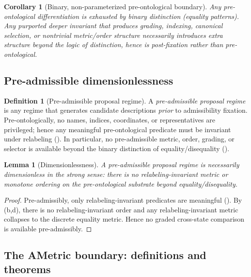 \documentclass[11pt]{article}
\newtheorem{lemma}[theorem]{Lemma}
\newtheorem{corollary}[theorem]{Corollary}
\theoremstyle{definition}
\newtheorem{definition}[theorem]{Definition}
\begin{document}
\begin{corollary}[Binary, non-parameterized pre-ontological boundary]
\label{cor:binary-ametric-boundary}
Any pre-ontological differentiation is exhausted by binary distinction (equality patterns).
Any purported deeper invariant that produces grading, indexing, canonical selection, or nontrivial metric/order structure
necessarily introduces extra structure beyond the logic of distinction, hence is \emph{post}-fixation rather than pre-ontological.
\end{corollary}

\subsection{Pre-admissible dimensionlessness}

\begin{definition}[Pre-admissible proposal regime]
A \emph{pre-admissible proposal regime} is any regime that generates candidate descriptions \emph{prior} to admissibility fixation.
Pre-ontologically, no names, indices, coordinates, or representatives are privileged; hence any meaningful pre-ontological predicate must be invariant under relabeling ().
In particular, no pre-admissible metric, order, grading, or selector is available beyond the binary distinction of equality/disequality ().
\end{definition}

\begin{lemma}[Dimensionlessness]
\label{lem:dimensionless}
A pre-admissible proposal regime is necessarily dimensionless in the strong sense: there is no relabeling-invariant
metric or monotone ordering on the pre-ontological substrate beyond equality/disequality.
\end{lemma}

\begin{proof}
Pre-admissibly, only relabeling-invariant predicates are meaningful ().
By (b,d), there is no relabeling-invariant order and any relabeling-invariant metric collapses to the discrete equality metric.
Hence no graded cross-state comparison is available pre-admissibly.
\end{proof}

\subsection{The AMetric boundary: definitions and theorems}
\end{document}
